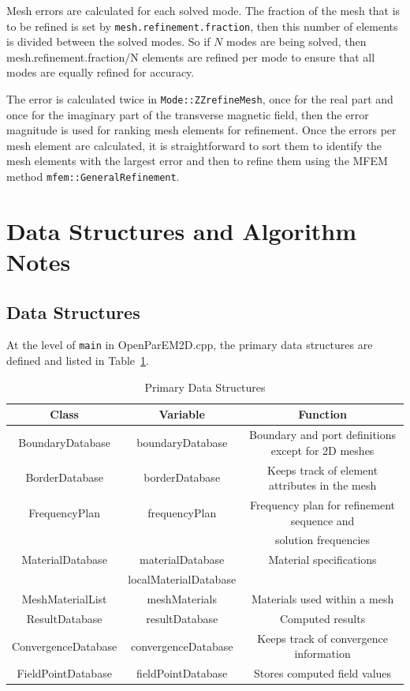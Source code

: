 \documentclass[titlepage]{article}
\renewcommand\_{\textunderscore\linebreak[1]}
\begin{document}
Mesh errors are calculated for each solved mode.  The fraction of the mesh that is to be refined is set by \texttt{mesh.refinement.fraction}, then this number of elements is divided between the solved modes.  So if $N$ modes are being solved, then mesh.refinement.fraction/N elements are refined per mode to ensure that all modes are equally refined for accuracy.  

The error is calculated twice in \texttt{Mode::ZZrefineMesh}, once for the real part and once for the imaginary part of the transverse magnetic field, then the error magnitude is used for ranking mesh elements for refinement.
Once the errors per mesh element are calculated, it is straightforward to sort them to identify the mesh elements with the largest error and then to refine them using the MFEM method \texttt{mfem::GeneralRefinement}.

\section{Data Structures and Algorithm Notes}

\subsection{Data Structures}

At the level of \texttt{main} in OpenParEM2D.cpp, the primary data structures are defined and listed in Table~\ref{table:data_structures}.
\begin{table}
\small
\caption{Primary Data Structures}
\begin{center}
\begin{tabular}{|c|c|c|}
\hline
Class & Variable & Function \\
\hline
BoundaryDatabase & boundaryDatabase & Boundary and port definitions except for 2D meshes \\
BorderDatabase & borderDatabase & Keeps track of element attributes in the mesh \\
FrequencyPlan & frequencyPlan & Frequency plan for refinement sequence and \\
              &               & solution frequencies \\
MaterialDatabase & materialDatabase       & Material specifications \\
                 & localMaterialDatabase  &                         \\
MeshMaterialList & meshMaterials & Materials used within a mesh \\
ResultDatabase & resultDatabase & Computed results \\
ConvergenceDatabase & convergenceDatabase & Keeps track of convergence information \\
FieldPointDatabase & fieldPointDatabase & Stores computed field values \\
\hline
\end{tabular}
\end{center}
\label{table:data_structures}
\end{table}
\end{document}
